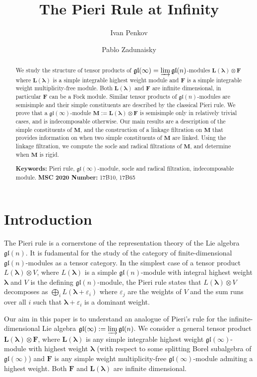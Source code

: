 \documentclass[11pt,fleqn]{amsart}
\title{The Pieri Rule at Infinity}
\date{}
\author{Ivan Penkov}
\author{Pablo Zadunaisky}
\renewcommand\epsilon{\varepsilon}
\theoremstyle{definition}
\theoremstyle{remark}
\theoremstyle{remark}
\newcommand\gl{\mathfrak{gl}}
\newcommand\wt[1]{\boldsymbol{#1}}
\begin{document}
\begin{abstract}
  We study the structure of tensor products of $\gl(\infty) = \varinjlim 
  \gl(n)$-modules $\mathbf L(\wt\lambda) \otimes \mathbf F$ where 
  $\mathbf L(\wt\lambda)$ is a simple integrable highest weight module and 
  $\mathbf F$ is a simple integrable weight multiplicity-free module. Both 
  $\mathbf L(\wt\lambda)$ and $\mathbf F$ are infinite dimensional, in 
  particular 
  $\mathbf F$ can be a Fock module. Similar tensor products of $\gl(n)$-modules 
  are semisimple and their simple constituents are described by the classical 
  Pieri rule. We prove that a $\gl(\infty)$-module $\mathbf M:= \mathbf 
  L(\wt\lambda) \otimes \mathbf F$ is semisimple only in relatively trivial 
  cases, and is indecomposable otherwise. Our main results are a description 
  of the simple constituents of $\mathbf M$, and the construction of a linkage 
  filtration on $\mathbf M$ that provides information on when two simple 
  constituents of $\mathbf M$ are linked. Using the linkage filtration, we 
  compute the socle and radical filtrations of $\mathbf M$, and determine when 
  $\mathbf M$ is rigid.

  \textbf{Keywords:} Pieri rule, $\gl(\infty)$-module, socle and radical filtration, indecomposable module. \textbf{MSC 2020 Number:} 17B10, 17B65
\end{abstract}

\maketitle


\section{Introduction}

The Pieri rule is a cornerstone of the representation theory of the Lie algebra 
$\gl(n)$. It is fudamental for the study of the category of finite-dimensional 
$\gl(n)$-modules as a tensor category. In the simplest case of a tensor product 
$L(\wt\lambda) \otimes V$, where $L(\wt\lambda)$ is a simple $\gl(n)$-module 
with integral highest weight $\wt\lambda$ and $V$ is the defining 
$\gl(n)$-module, the Pieri rule states that $L(\wt\lambda) \otimes V$ 
decomposes as $\bigoplus_{i} L(\wt\lambda + \epsilon_i)$ where $\epsilon_j$ 
are the weights of $V$ and the sum runs over all $i$ such that $\wt\lambda + 
\epsilon_i$ is a dominant weight.

Our aim in this paper is to understand an analogue of Pieri's rule for the 
infinite-dimensional Lie algebra $\gl(\infty) := \varinjlim \gl(n)$. We consider
a general tensor product $\mathbf L(\wt\lambda) \otimes \mathbf F$, where 
$\mathbf L(\wt\lambda)$ is any simple integrable highest weight 
$\gl(\infty)$-module with highest weight $\wt\lambda$  (with respect to
some splitting Borel subalgebra of $\gl(\infty)$) and $\mathbf F$ is any 
simple weight multiplicity-free $\gl(\infty)$-module admiting a highest weight. 
Both $\mathbf F$ and $\mathbf L(\wt\lambda)$ are infinite dimensional.
\end{document}
